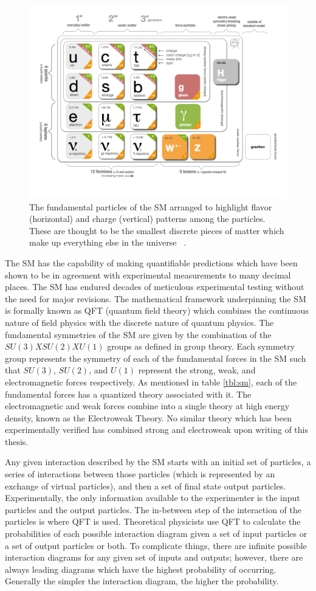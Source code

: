 \begin{figure}[!ht]
\begin{center}
\includegraphics[width=0.65\linewidth]{figs/standard_model_chart.png}
\caption{The fundamental particles of the SM arranged to highlight flavor (horizontal) and charge (vertical) patterns among the particles. These are thought to be the smallest discrete pieces of matter which make up everything else in the universe ~\cite{PhysRevD.86.010001}.}
\end{center}
\label{fig:stnd_mdl_chart}
\end{figure}

The SM has the capability of making quantifiable predictions which have been shown to be in agreement with experimental measurements to many decimal places. The SM has endured decades of meticulous experimental testing without the need for major revisions. The mathematical framework underpinning the SM is formally known as QFT (quantum field theory) which combines the continuous nature of field physics with the discrete nature of quantum physics. 
The fundamental symmetries of the SM are given by the combination of the $SU(3)XSU(2)XU(1)$ groups as defined in group theory. Each symmetry group represents the symmetry of each of the fundamental forces in the SM such that $SU(3)$, $SU(2)$, and $U(1)$ represent the strong, weak, and electromagnetic forces respectively. As mentioned in table \ref{tbl:sm}, each of the fundamental forces has a quantized theory associated with it. The electromagnetic and weak forces combine into a single theory at high energy density, known as the Electroweak Theory. No similar theory which has been experimentally verified has combined strong and electroweak upon writing of this thesis.

Any given interaction described by the SM starts with an initial set of particles, a series of interactions between those particles (which is represented by an exchange of virtual particles), and then a set of final state output particles. Experimentally, the only information available to the experimenter is the input particles and the output particles. The in-between step of the interaction of the particles is where QFT is used. Theoretical physicists use QFT to calculate the probabilities of each possible interaction diagram given a set of input particles or a set of output particles or both. To complicate things, there are infinite possible interaction diagrams for any given set of inputs and outputs; however, there are always leading diagrams which have the highest probability of occurring. Generally the simpler the interaction diagram, the higher the probability.

